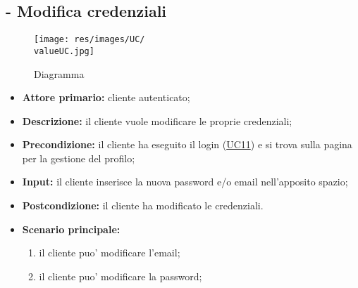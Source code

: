 \subsection{ - Modifica credenziali}
\begin{figure}[H]
    \centering
    \texttt{[image: res/images/UC/\\valueUC.jpg]}
    \caption{Diagramma }
\end{figure}
\begin{itemize}
    \item \textbf{Attore primario:} cliente autenticato;
    \item \textbf{Descrizione:} il cliente vuole modificare le proprie credenziali;
    \item \textbf{Precondizione:} il cliente ha eseguito il login (\hyperref[UC11]{UC11}) e si trova sulla pagina per la gestione del profilo;
    \item \textbf{Input:} il cliente inserisce la nuova password e/o email nell'apposito spazio;
    \item \textbf{Postcondizione:} il cliente ha modificato le credenziali.
    \item \textbf{Scenario principale:}
    \begin{enumerate}
        \item il cliente puo' modificare l'email;
        \item il cliente puo' modificare la password;
    \end{enumerate}
\end{itemize}

\stepsubUserCase
